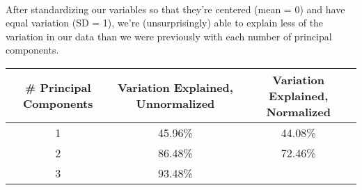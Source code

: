 \documentclass{article}
\begin{document}
    \begin{center}
    \end{center}
    { \hspace*{\fill} \\}
    
    After standardizing our variables so that they're centered (mean = 0)
and have equal variation (SD = 1), we're (unsurprisingly) able to
explain less of the variation in our data than we were previously with
each number of principal components.

\begin{longtable}[c]{@{}ccc@{}}
\toprule
\begin{minipage}[b]{0.06\columnwidth}\centering\strut
\# Principal Components
\strut\end{minipage} &
\begin{minipage}[b]{0.08\columnwidth}\centering\strut
Variation Explained, Unnormalized
\strut\end{minipage} &
\begin{minipage}[b]{0.08\columnwidth}\centering\strut
Variation Explained, Normalized
\strut\end{minipage}\tabularnewline
\midrule
\endhead
\begin{minipage}[t]{0.06\columnwidth}\centering\strut
1
\strut\end{minipage} &
\begin{minipage}[t]{0.08\columnwidth}\centering\strut
45.96\%
\strut\end{minipage} &
\begin{minipage}[t]{0.08\columnwidth}\centering\strut
44.08\%
\strut\end{minipage}\tabularnewline
\begin{minipage}[t]{0.06\columnwidth}\centering\strut
2
\strut\end{minipage} &
\begin{minipage}[t]{0.08\columnwidth}\centering\strut
86.48\%
\strut\end{minipage} &
\begin{minipage}[t]{0.08\columnwidth}\centering\strut
72.46\%
\strut\end{minipage}\tabularnewline
\begin{minipage}[t]{0.06\columnwidth}\centering\strut
3
\strut\end{minipage} &
\begin{minipage}[t]{0.08\columnwidth}\centering\strut
93.48\%

\end{minipage}
\end{longtable}
\end{document}
